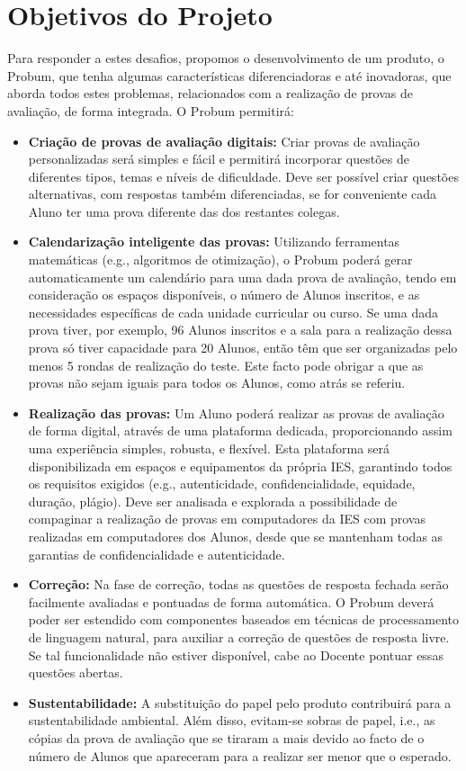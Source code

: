 \section*{Objetivos do Projeto}
{\TextoCor
Para responder a estes desafios, propomos o desenvolvimento de um produto, o Probum, que tenha algumas características diferenciadoras e até inovadoras, que aborda todos estes problemas, relacionados com a realização de provas de avaliação, de forma integrada. O Probum permitirá:

\begin{itemize}
\item \textbf{Criação de provas de avaliação digitais:} Criar provas de avaliação personalizadas será simples e fácil e permitirá incorporar questões de diferentes tipos, temas e níveis de dificuldade. Deve ser possível criar questões alternativas, com respostas também diferenciadas, se for conveniente cada Aluno ter uma prova diferente das dos restantes colegas.
\item \textbf{Calendarização inteligente das provas:} Utilizando ferramentas matemáticas (e.g., algoritmos de otimização), o Probum poderá gerar automaticamente um calendário para uma dada prova de avaliação, tendo em consideração os espaços disponíveis, o número de Alunos inscritos, e as necessidades específicas de cada unidade curricular ou curso. Se uma dada prova tiver, por exemplo, 96 Alunos inscritos e a sala para a realização dessa prova só tiver capacidade para 20 Alunos, então têm que ser organizadas pelo menos 5 rondas de realização do teste. Este facto pode obrigar a que as provas não sejam iguais para todos os Alunos, como atrás se referiu.  
\item \textbf{Realização das provas:} Um Aluno poderá realizar as provas de avaliação de forma digital, através de uma plataforma dedicada, proporcionando assim uma experiência simples, robusta, e flexível. Esta plataforma será disponibilizada em espaços e equipamentos da própria IES, garantindo todos os requisitos exigidos (e.g., autenticidade, confidencialidade, equidade, duração, plágio). Deve ser analisada e explorada a possibilidade de compaginar a realização de provas em computadores da IES com provas realizadas em computadores dos Alunos, desde que se mantenham todas as garantias de confidencialidade e autenticidade.
\item \textbf{Correção:} Na fase de correção, todas as questões de resposta fechada serão facilmente avaliadas e pontuadas de forma automática. O Probum deverá poder ser estendido com componentes baseados em técnicas de processamento de linguagem natural, para auxiliar a correção de questões de resposta livre. Se tal funcionalidade não estiver disponível, cabe ao Docente pontuar essas questões abertas.
\item \textbf{Sustentabilidade:} A substituição do papel pelo produto contribuirá para a sustentabilidade ambiental. Além disso, evitam-se sobras de papel, i.e., as cópias da prova de avaliação que se tiraram a mais devido ao facto de o número de Alunos que apareceram para a realizar ser menor que o esperado.


\end{itemize}}

